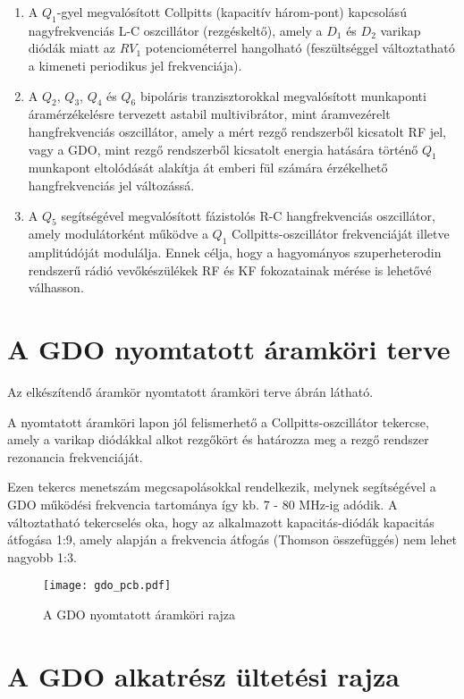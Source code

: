 \begin{enumerate}
\item
A $Q_1$-gyel megvalósított Collpitts (kapacitív három-pont) kapcsolású nagyfrekvenciás L-C oszcillátor (rezgéskeltő), amely a $D_1$ és $D_2$ varikap diódák miatt az $RV_1$ potenciométerrel hangolható (feszültséggel változtatható a kimeneti periodikus jel frekvenciája).
\item
A $Q_2$, $Q_3$, $Q_4$ és $Q_6$ bipoláris tranzisztorokkal megvalósított munkaponti áramérzékelésre tervezett astabil multivibrátor, mint áramvezérelt hangfrekvenciás oszcillátor, amely a mért rezgő rendszerből kicsatolt RF jel, vagy a GDO, mint rezgő rendszerből kicsatolt energia hatására történő $Q_1$ munkapont eltolódását alakítja át emberi fül számára érzékelhető hangfrekvenciás jel változássá.
\item
A $Q_5$ segítségével megvalósított fázistolós R-C hangfrekvenciás oszcillátor, amely modulátorként működve a $Q_1$ Collpitts-oszcillátor frekvenciáját illetve amplitúdóját modulálja. Ennek célja, hogy a hagyományos szuperheterodin rendszerű rádió vevőkészülékek RF és KF fokozatainak mérése is lehetővé válhasson.
\end{enumerate}

\section{A GDO nyomtatott áramköri terve}

Az elkészítendő áramkör nyomtatott áramköri terve  ábrán látható.

A nyomtatott áramköri lapon jól felismerhető a Collpitts-oszcillátor tekercse, amely a varikap diódákkal alkot rezgőkört és határozza meg a rezgő rendszer rezonancia frekvenciáját.

Ezen tekercs menetszám megcsapolásokkal rendelkezik, melynek segítségével a GDO működési frekvencia tartománya így kb. 7 - 80 MHz-ig adódik. A változtatható tekercselés oka, hogy az alkalmazott kapacitás-diódák kapacitás átfogása 1:9, amely alapján a frekvencia átfogás (Thomson összefüggés) nem lehet nagyobb 1:3.

\begin{figure}[!ht]
\centering
\texttt{[image: gdo\_pcb.pdf]}
\caption{A GDO nyomtatott áramköri rajza}
\label{fig:gdopcb} 
\end{figure}

\section{A GDO alkatrész ültetési rajza}

